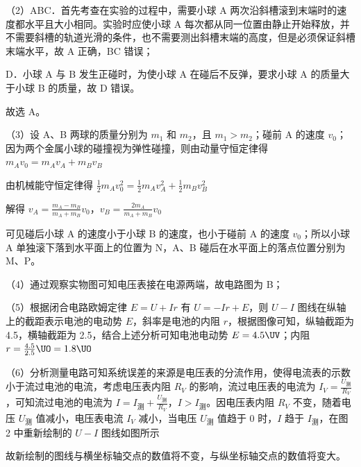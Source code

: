 \documentclass[\gkver]{gaokaozhenti}
\begin{document}
\begin{enumerate}
{（2）ABC．首先考查在实验的过程中，需要小球 A 两次沿斜槽滚到末端时的速度都水平且大小相同。实验时应使小球 A 每次都从同一位置由静止开始释放，并不需要斜槽的轨道光滑的条件，也不需要测出斜槽末端的高度，但是必须保证斜槽末端水平，故 A 正确，BC 错误；

D．小球 A 与 B 发生正碰时，为使小球 A 在碰后不反弹，要求小球 A 的质量大于小球 B 的质量，故 D 错误。

故选 A。

（3）设 A、B 两球的质量分别为 $m_{1}$ 和 $m_{2}$，且 $m_{1} > m_{2}$；碰前 A 的速度 $v_{0}$；因为两个金属小球的碰撞视为弹性碰撞，则由动量守恒定律得
$m_{A}v_{0}=m_{A}v_{A}+m_{B}v_{B}$

由机械能守恒定律得
$\frac{1}{2}m_{A}v_{0}^{2}=\frac{1}{2}m_{A}v_{A}^{2}+\frac{1}{2}m_{B}v_{B}^{2}$

解得
$v_{A}=\frac{m_{A}-m_{B}}{m_{A}+m_{B}}v_{0}$，$v_{B}=\frac{2m_{A}}{m_{A}+m_{B}}v_{0}$

可见碰后小球 A 的速度小于小球 B 的速度，也小于碰前 A 的速度 $v_{0}$；所以小球 A 单独滚下落到水平面上的位置为 N，A、B 碰后在水平面上的落点位置分别为 M、P。

（4）通过观察实物图可知电压表接在电源两端，故电路图为 B；

（5）根据闭合电路欧姆定律 $E = U + Ir$ 有 $U = -Ir + E$，则 $U - I$ 图线在纵轴上的截距表示电池的电动势 $E$，斜率是电池的内阻 $r$，根据图像可知，纵轴截距为 4.5，横轴截距为 2.5，结合上述分析可知电池电动势 $E = 4.5 \UV$；内阻
$r=\frac{4.5}{2.5}\UO=1.8\UO$

（6）分析测量电路可知系统误差的来源是电压表的分流作用，使得电流表的示数小于流过电池的电流，考虑电压表内阻 $R_{V}$ 的影响，流过电压表的电流为 $I_{V} = \frac{U_{\text{测}}}{R_{V}}$，可知流过电池的电流为 $I = I_{\text{测}} + \frac{U_{\text{测}}}{R_{V}}$，$I > I_{\text{测}}$。因电压表内阻 $R_{V}$ 不变，随着电压 $U_{\text{测}}$ 值减小，电压表电流 $I_{V}$ 减小，当电压 $U_{\text{测}}$ 值趋于 0 时，$I$ 趋于 $I_{\text{测}}$，在图 2 中重新绘制的 $U - I$ 图线如图所示


故新绘制的图线与横坐标轴交点的数值将不变，与纵坐标轴交点的数值将变大。
}


\end{enumerate}
\end{document}
